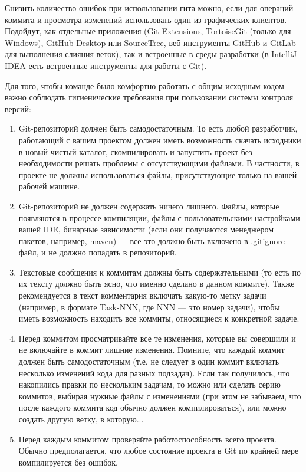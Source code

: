 \documentclass[a4paper,12pt]{article}
\begin{document}
Снизить количество ошибок при использовании гита можно, если для операций коммита и просмотра изменений использовать один из графических клиентов. Подойдут, как отдельные приложения (Git Extensions, TortoiseGit (только для Windows), GitHub Desktop или SourceTree, веб-инструменты GitHub и GitLab для выполнения слияния веток), так и встроенные в среды разработки (в IntelliJ IDEA есть встроенные инструменты для работы с Git).

Для того, чтобы команде было комфортно работать с общим исходным кодом важно соблюдать гигиенические требования при пользовании системы контроля версий:
\begin{enumerate}
    \item Git-репозиторий должен быть самодостаточным. То есть любой разработчик, работающий с вашим проектом должен иметь возможность скачать исходники в новый чистый каталог, скомпилировать и запустить проект без необходимости решать проблемы с отсутствующими файлами. В частности, в проекте не должны использоваться файлы, присутствующие только на вашей рабочей машине.
    \item Git-репозиторий не должен содержать ничего лишнего. Файлы, которые появляются в процессе компиляции, файлы с пользовательскими настройками вашей IDE, бинарные зависимости (если они получаются менеджером пакетов, например, maven) — все это должно быть включено в .gitignore-файл, и не должно попадать в репозиторий.
    \item Текстовые сообщения к коммитам должны быть содержательными (то есть по их тексту должно быть ясно, что именно сделано в данном коммите). Также рекомендуется в текст комментария включать какую-то метку задачи (например, в формате Task-NNN, где NNN — это номер задачи), чтобы иметь возможность находить все коммиты, относящиеся к конкретной задаче.
    \item Перед коммитом просматривайте все те изменения, которые вы совершили и не включайте в коммит лишние изменения. Помните, что каждый коммит должен быть самодостаточным (т.е. не следует в один коммит включать несколько изменений кода для разных подзадач). Если так получилось, что накопились правки по нескольким задачам, то можно или сделать серию коммитов, выбирая нужные файлы с изменениями (при этом не забываем, что после каждого коммита код обычно должен компилироваться), или можно создать другую ветку, в которую...
    \item Перед каждым коммитом проверяйте работоспособность всего проекта. Обычно предполагается, что любое состояние проекта в Git по крайней мере компилируется без ошибок.

\end{enumerate}
\end{document}

